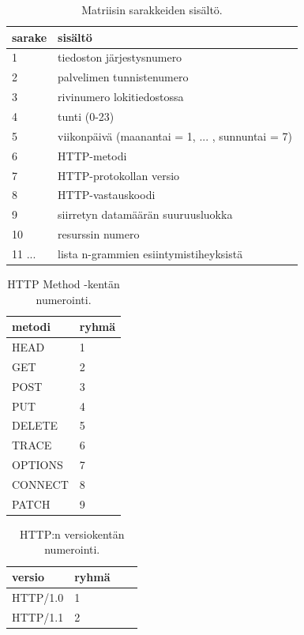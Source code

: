 \begin{table}[p]
\centering
\begin{tabular}{l|l}
sarake & sisältö \\
\hline

1 & tiedoston järjestysnumero \\
2 & palvelimen tunnistenumero \\
3 & rivinumero lokitiedostossa \\
4 & tunti (0-23) \\
5 & viikonpäivä (maanantai = 1, ... , sunnuntai = 7) \\
6 & HTTP-metodi \\
7 & HTTP-protokollan versio \\
8 & HTTP-vastauskoodi \\
9 & siirretyn datamäärän suuruusluokka \\
10 & resurssin numero \\
11 ... & lista n-grammien esiintymistiheyksistä \\

\end{tabular}
\caption{Matriisin sarakkeiden sisältö.}
\label{matriisi}
\end{table}

\begin{table}[p]
\centering
\begin{tabular}{ll}
metodi & ryhmä \\
\hline
HEAD & 1 \\
GET & 2 \\
POST & 3 \\
PUT & 4 \\
DELETE & 5 \\
TRACE & 6 \\
OPTIONS & 7 \\
CONNECT & 8 \\
PATCH & 9 \\

\end{tabular}
\caption{HTTP Method -kentän numerointi.}
\label{metodi}
\end{table}

\begin{table}[p]
\centering
\begin{tabular}{llll}
versio & ryhmä \\
\hline
HTTP/1.0 & 1 \\
HTTP/1.1 & 2 \\
\end{tabular}
\caption{ HTTP:n versiokentän numerointi.}
\label{httpversio}
\end{table}

